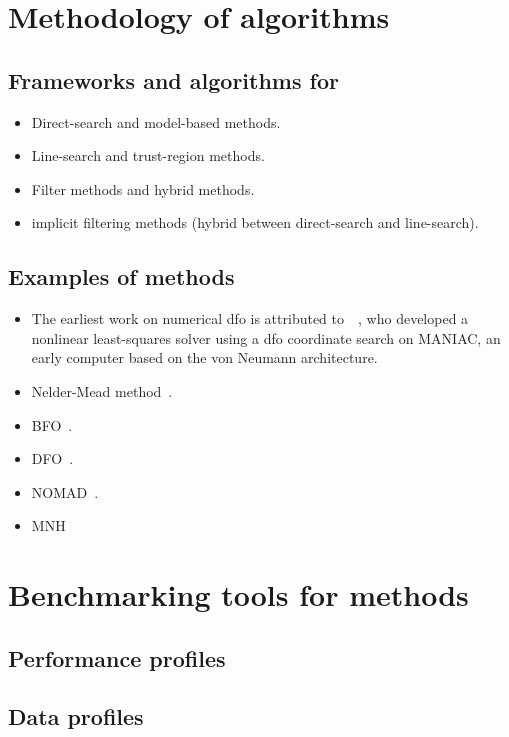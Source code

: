 \section{Methodology of  algorithms}

\subsection{Frameworks and algorithms for }

\begin{itemize}
    \item Direct-search and model-based methods.
    \item Line-search and trust-region methods.
    \item Filter methods and hybrid methods.
    \item implicit filtering methods (hybrid between direct-search and line-search).
\end{itemize}

\subsection{Examples of  methods}

\begin{itemize}
    \item The earliest work on numerical \gls{dfo} is attributed to~\citeauthor{Fermi_Metropolis_1952}~\cite{Fermi_Metropolis_1952}, who developed a nonlinear least-squares solver using a \gls{dfo} coordinate search on MANIAC, an early computer based on the von Neumann architecture.
    \item Nelder-Mead method~\cite{Nelder_Mead_1965}.
    \item BFO~\cite{Porcelli_Toint_2017}.
    \item DFO~\cite{Conn_Scheinberg_Toint_1998}.
    \item NOMAD~\cite{Digabel_2011}.
    \item MNH~\cite{Wild_2008}
\end{itemize}

\section{Benchmarking tools for  methods}

\subsection{Performance profiles}

\subsection{Data profiles}
